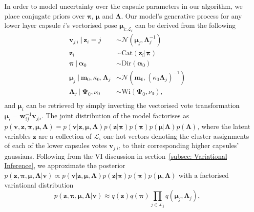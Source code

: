 \documentclass[letterpaper]{article} \usepackage{aaai20}  \usepackage{times}  \usepackage{helvet} \usepackage{courier}  \usepackage[hyphens]{url}  \usepackage{graphicx} \urlstyle{rm} \def\UrlFont{\rm}  \usepackage{graphicx}  \frenchspacing  \setlength{\pdfpagewidth}{8.5in}  \setlength{\pdfpageheight}{11in}  \nocopyright
\begin{document}
In order to model uncertainty over the capsule parameters in our algorithm, we place conjugate priors over $\boldsymbol{\pi}$, $\boldsymbol{\mu}$ and $\boldsymbol{\Lambda}$. Our model's generative process for any lower layer capsule $i$'s vectorised pose $\boldsymbol{\mu}_{i:\mathcal{L}_i}$ can be derived from the following
\begin{equation}
\begin{aligned}
    \mathbf{v}_{j|i} \ |\ \mathbf{z}_i = j
    &\sim\mathcal{N}(\boldsymbol{\mu}_j,\boldsymbol{\Lambda}_j^{-1}) \\
    \mathbf{z}_i &\sim\mathrm{Cat}(\mathbf{z}_i|\boldsymbol{\pi}) \\
    \boldsymbol{\pi} \ | \ \boldsymbol{\alpha}_0 \ &\sim\mathrm{Dir}(\boldsymbol{\alpha}_0) \\
    \boldsymbol{\mu}_j \ | \ \mathbf{m}_0, \kappa_0, \boldsymbol{\Lambda}_j &\sim\mathcal{N}(\mathbf{m}_0, (\kappa_0\boldsymbol{\Lambda}_j)^{-1}) \\
    \boldsymbol{\Lambda}_j \ | \ \boldsymbol{\Psi}_0, \nu_0 &\sim\mathrm{Wi}(\boldsymbol{\Psi}_0, \nu_0), \\
\end{aligned}
\end{equation}
and $\boldsymbol{\mu}_{i}$ can be retrieved by simply inverting the vectorised vote transformation $\boldsymbol{\mu}_i = \mathbf{w}_{ij}^{-1}\mathbf{v}_{j|i}$. The joint distribution of the model factorises as $p(\mathbf{v},\mathbf{z}, \boldsymbol{\pi}, \boldsymbol{\mu}, \boldsymbol{\Lambda}) =  p(\mathbf{v}|\mathbf{z},\boldsymbol{\mu}, \boldsymbol{\Lambda}) p(\mathbf{z}|\boldsymbol{\pi}) p(\boldsymbol{\pi}) p(\boldsymbol{\mu}|\boldsymbol{\Lambda}) p(\boldsymbol{\Lambda})$, where the latent variables $\mathbf{z}$ are a collection of $\mathcal{L}_i$ one-hot vectors denoting the cluster assignments of each of the lower capsules votes $\mathbf{v}_{j|i}$, to their corresponding higher capsules' gaussians. 
Following from the VI discussion in section~\ref{subsec: Variational Inference}, we approximate the posterior $p(\mathbf{z},\boldsymbol{\pi},\boldsymbol{\mu},\boldsymbol{\Lambda}|\mathbf{v}) \propto p(\mathbf{v}|\mathbf{z},\boldsymbol{\mu},\boldsymbol{\Lambda}) p(\mathbf{z}|\boldsymbol{\pi})p(\boldsymbol{\pi})p(\boldsymbol{\mu},\boldsymbol{\Lambda})$ with a factorised variational distribution
\begin{equation}
    p(\mathbf{z},\boldsymbol{\pi},\boldsymbol{\mu},\boldsymbol{\Lambda}|\mathbf{v}) \approx q(\mathbf{z})q(\boldsymbol{\pi}) \prod_{j \in \mathcal{L}_j} q(\boldsymbol{\mu}_j, \boldsymbol{\Lambda}_j),
\end{equation}
\end{document}
